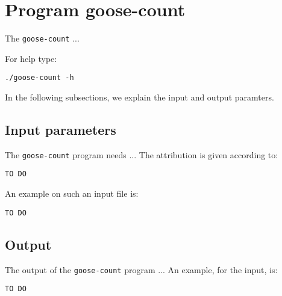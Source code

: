 \section{Program goose-count}
The \texttt{goose-count} ...

For help type:
\begin{lstlisting}
./goose-count -h
\end{lstlisting}
In the following subsections, we explain the input and output paramters.

\subsection*{Input parameters}

The \texttt{goose-count} program needs ...
The attribution is given according to:
\begin{lstlisting}
TO DO
\end{lstlisting}

An example on such an input file is:
\begin{lstlisting}
TO DO
\end{lstlisting}

\subsection*{Output}
The output of the \texttt{goose-count} program ...
An example, for the input, is:
\begin{lstlisting}
TO DO
\end{lstlisting}
